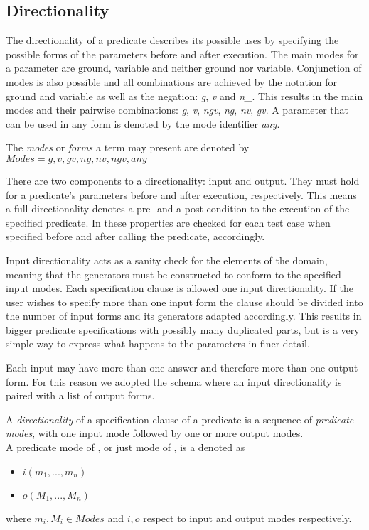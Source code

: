\subsection{Directionality}

The directionality of a predicate describes its possible uses by
specifying the possible forms of the parameters before and after
execution.
%
The main modes for a parameter are ground, variable and neither ground
nor variable.
%
Conjunction of modes is also possible and all combinations are achieved
by the notation for ground and variable as well as the negation:
\emph{g}, \emph{v} and \emph{n\_}.
%
This results in the main modes and their pairwise combinations: \emph{g},
\emph{v}, \emph{ngv},  \emph{ng}, \emph{nv}, \emph{gv}.
%
A parameter that can be used in any form is denoted by the mode
identifier \emph{any}.


\begin{definition}
\label{def:modes}
The \emph{modes} or \emph{forms} a term may present are denoted by\\
 $Modes = {g, v, gv, ng, nv, ngv, any}$
\end{definition}


There are two components to a directionality: input and output.
%
They must hold for a predicate's parameters before and after execution,
respectively.
%
This means a full directionality denotes a pre- and a post-condition to
the execution of the specified predicate.
%
In \plqc{} these properties are checked for each test case when
specified before and after calling the predicate, accordingly.


Input directionality acts as a sanity check for the elements of the
domain, meaning that the generators must be constructed to conform to the
specified input modes.
%
Each specification clause is allowed one input directionality.
%
If the user wishes to specify more than one input form the clause should
be divided into the number of input forms and its generators adapted
accordingly.
%
This results in bigger predicate specifications with possibly many
duplicated parts, but is a very simple way to express what happens to the
parameters in finer detail.


Each input may have more than one answer and therefore more than one
output form.
%
For this reason we adopted the schema where an input directionality is
paired with a list of output forms.


\begin{definition}
\label{def:directionality}
A \emph{directionality} of a specification clause of a predicate
 is a sequence of \emph{predicate modes}, with one input mode
followed by one or more output modes.
\\
A predicate mode of , or just mode of , is a denoted as
\begin{itemize}
  \item $i(m_1, ..., m_n)$
  \item $o(M_1, ..., M_n)$
\end{itemize}
where $m_i,M_i \in Modes$ and $i, o$ respect to input and output modes
respectively.
\end{definition}


